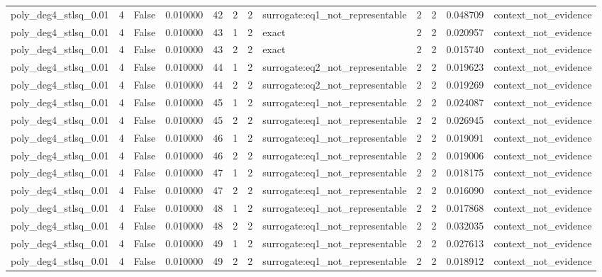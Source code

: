 \begin{tabular}{lrrrrrrlrrrl}
poly\_deg4\_stlsq\_0.01 & 4 & False & 0.010000 & 42 & 2 & 2 & surrogate:eq1\_not\_representable & 2 & 2 & 0.048709 & context\_not\_evidence \\
poly\_deg4\_stlsq\_0.01 & 4 & False & 0.010000 & 43 & 1 & 2 & exact & 2 & 2 & 0.020957 & context\_not\_evidence \\
poly\_deg4\_stlsq\_0.01 & 4 & False & 0.010000 & 43 & 2 & 2 & exact & 2 & 2 & 0.015740 & context\_not\_evidence \\
poly\_deg4\_stlsq\_0.01 & 4 & False & 0.010000 & 44 & 1 & 2 & surrogate:eq2\_not\_representable & 2 & 2 & 0.019623 & context\_not\_evidence \\
poly\_deg4\_stlsq\_0.01 & 4 & False & 0.010000 & 44 & 2 & 2 & surrogate:eq2\_not\_representable & 2 & 2 & 0.019269 & context\_not\_evidence \\
poly\_deg4\_stlsq\_0.01 & 4 & False & 0.010000 & 45 & 1 & 2 & surrogate:eq1\_not\_representable & 2 & 2 & 0.024087 & context\_not\_evidence \\
poly\_deg4\_stlsq\_0.01 & 4 & False & 0.010000 & 45 & 2 & 2 & surrogate:eq1\_not\_representable & 2 & 2 & 0.026945 & context\_not\_evidence \\
poly\_deg4\_stlsq\_0.01 & 4 & False & 0.010000 & 46 & 1 & 2 & surrogate:eq1\_not\_representable & 2 & 2 & 0.019091 & context\_not\_evidence \\
poly\_deg4\_stlsq\_0.01 & 4 & False & 0.010000 & 46 & 2 & 2 & surrogate:eq1\_not\_representable & 2 & 2 & 0.019006 & context\_not\_evidence \\
poly\_deg4\_stlsq\_0.01 & 4 & False & 0.010000 & 47 & 1 & 2 & surrogate:eq1\_not\_representable & 2 & 2 & 0.018175 & context\_not\_evidence \\
poly\_deg4\_stlsq\_0.01 & 4 & False & 0.010000 & 47 & 2 & 2 & surrogate:eq1\_not\_representable & 2 & 2 & 0.016090 & context\_not\_evidence \\
poly\_deg4\_stlsq\_0.01 & 4 & False & 0.010000 & 48 & 1 & 2 & surrogate:eq1\_not\_representable & 2 & 2 & 0.017868 & context\_not\_evidence \\
poly\_deg4\_stlsq\_0.01 & 4 & False & 0.010000 & 48 & 2 & 2 & surrogate:eq1\_not\_representable & 2 & 2 & 0.032035 & context\_not\_evidence \\
poly\_deg4\_stlsq\_0.01 & 4 & False & 0.010000 & 49 & 1 & 2 & surrogate:eq1\_not\_representable & 2 & 2 & 0.027613 & context\_not\_evidence \\
poly\_deg4\_stlsq\_0.01 & 4 & False & 0.010000 & 49 & 2 & 2 & surrogate:eq1\_not\_representable & 2 & 2 & 0.018912 & context\_not\_evidence \\

\end{tabular}
